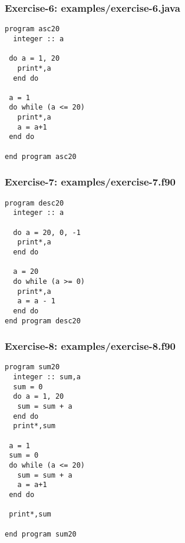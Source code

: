 \documentclass[xcolor=dvipsnames,dvip,notes=show,table]{beamer}
\begin{document}
\begin{frame}[fragile]
\frametitle{Exercise-6: examples/exercise-6.java}
\scriptsize
\begin{lstlisting}
program asc20
  integer :: a
  
 do a = 1, 20
   print*,a
  end do

 a = 1 
 do while (a <= 20) 
   print*,a
   a = a+1
 end do

end program asc20
\end{lstlisting}
\end{frame}



\begin{frame}[fragile]
\frametitle{Exercise-7: examples/exercise-7.f90}
\scriptsize
\begin{lstlisting}
program desc20
  integer :: a

  do a = 20, 0, -1
   print*,a
  end do

  a = 20
  do while (a >= 0) 
   print*,a
   a = a - 1
  end do
end program desc20
\end{lstlisting}
\end{frame}




\begin{frame}[fragile]
\frametitle{Exercise-8: examples/exercise-8.f90}
\scriptsize
\begin{lstlisting}
program sum20
  integer :: sum,a
  sum = 0
  do a = 1, 20
   sum = sum + a    
  end do
  print*,sum

 a = 1 
 sum = 0
 do while (a <= 20) 
   sum = sum + a    
   a = a+1
 end do

 print*,sum

end program sum20
\end{lstlisting}
\end{frame}


\end{document}
